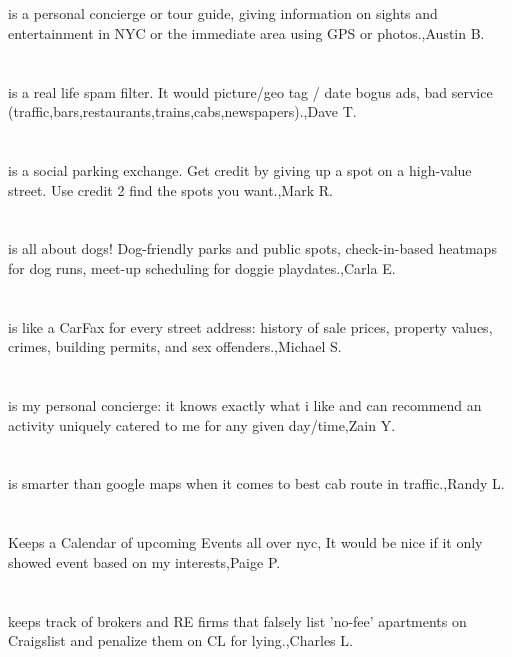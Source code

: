 \section{}is a personal concierge or tour guide, giving information on sights and entertainment in NYC or the immediate area using GPS or photos.,Austin B.	
\section{}is a real life spam filter. It would picture/geo tag / date bogus ads, bad service (traffic,bars,restaurants,trains,cabs,newspapers).,Dave T.	
\section{}is a social parking exchange.  Get credit by giving up a spot on a high-value street.  Use credit 2 find the spots you want.,Mark R.	
\section{}is all about dogs! Dog-friendly parks and public spots, check-in-based heatmaps for dog runs, meet-up scheduling for doggie playdates.,Carla E.	
\section{}is like a CarFax for every street address: history of sale prices, property values, crimes, building permits, and sex offenders.,Michael S.	
\section{}is my personal concierge: it knows exactly what i like and can recommend an activity uniquely catered to me for any given day/time,Zain Y.	
\section{}is smarter than google maps when it comes to best cab route in traffic.,Randy L.	
\section{}Keeps a Calendar of upcoming Events all over nyc, It would be nice if it only showed event based on my interests,Paige P.	
\section{}keeps track of brokers and RE firms that falsely list 'no-fee' apartments on Craigslist and penalize them on CL for lying.,Charles L.	

